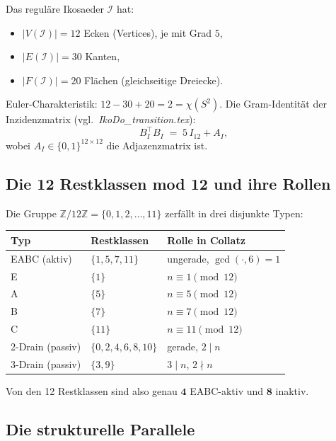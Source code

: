 \documentclass[12pt,a4paper]{article}
\newcommand{\Z}{\mathbb{Z}}
\newcommand{\ZmZ}{\Z/12\Z}
\begin{document}
\begin{tcolorbox}[ergebnis, title={Ikosaeder-Grunddaten -- bewiesen (Euler, Euklid)}]
Das reguläre Ikosaeder $\mathcal{I}$ hat:
\begin{itemize}[noitemsep]
  \item $|V(\mathcal{I})| = 12$ Ecken (Vertices), je mit Grad $5$,
  \item $|E(\mathcal{I})| = 30$ Kanten,
  \item $|F(\mathcal{I})| = 20$ Flächen (gleichseitige Dreiecke).
\end{itemize}
Euler-Charakteristik: $12 - 30 + 20 = 2 = \chi(S^2)$.
Die Gram-Identität der Inzidenzmatrix (vgl.\ \textit{IkoDo\_transition.tex}):
\[
  B_I^\top B_I \;=\; 5\,I_{12} + A_I,
\]
wobei $A_I \in \{0,1\}^{12 \times 12}$ die Adjazenzmatrix ist.
\end{tcolorbox}

\subsection{Die 12 Restklassen mod 12 und ihre Rollen}

\begin{tcolorbox}[ergebnis, title={Struktursatz der Restklassen mod 12 -- bewiesen}]
Die Gruppe $\ZmZ = \{0, 1, 2, \dots, 11\}$ zerfällt in drei disjunkte
Typen:
\begin{center}
\renewcommand{\arraystretch}{1.3}
\begin{tabular}{lll}
\toprule
Typ & Restklassen & Rolle in Collatz \\
\midrule
EABC (aktiv) & $\{1, 5, 7, 11\}$ & ungerade, $\gcd(\cdot, 6) = 1$ \\
\quad E & $\{1\}$ & $n \equiv 1 \pmod{12}$ \\
\quad A & $\{5\}$ & $n \equiv 5 \pmod{12}$ \\
\quad B & $\{7\}$ & $n \equiv 7 \pmod{12}$ \\
\quad C & $\{11\}$ & $n \equiv 11 \pmod{12}$ \\
\midrule
2-Drain (passiv) & $\{0, 2, 4, 6, 8, 10\}$ & gerade, $2 \mid n$ \\
3-Drain (passiv) & $\{3, 9\}$ & $3 \mid n$, $2 \nmid n$ \\
\bottomrule
\end{tabular}
\end{center}
Von den 12 Restklassen sind also genau $\mathbf{4}$ EABC-aktiv und
$\mathbf{8}$ inaktiv.
\end{tcolorbox}

\subsection{Die strukturelle Parallele}
\end{document}
